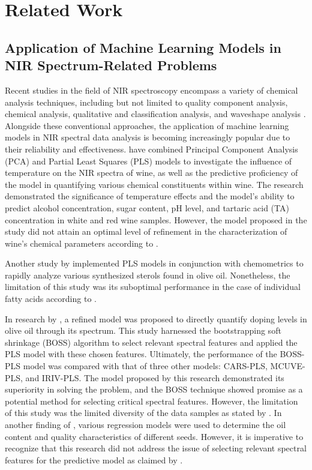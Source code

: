 \documentclass[10pt, a4paper, oneside]{article}
\begin{document}
\section{Related Work}
\subsection{Application of Machine Learning Models in NIR Spectrum-Related Problems}
Recent studies in the field of NIR spectroscopy encompass a variety of chemical analysis techniques, including but not limited to quality component analysis, chemical analysis, qualitative and classification analysis, and waveshape analysis \cite{huy2023sentiment}. Alongside these conventional approaches, the application of machine learning models in NIR spectral data analysis is becoming increasingly popular due to their reliability and effectiveness.
\cite{cozzolino2007effect} have combined Principal Component Analysis (PCA) and Partial Least Squares (PLS) models to investigate the influence of temperature on the NIR spectra of wine, as well as the predictive proficiency of the model in quantifying various chemical constituents within wine. The research demonstrated the significance of temperature effects and the model's ability to predict alcohol concentration, sugar content, pH level, and tartaric acid (TA) concentration in white and red wine samples. However, the model proposed in the study did not attain an optimal level of refinement in the characterization of wine's chemical parameters according to \cite{zhang2022review}.

Another study by \cite{ozdemir2018quantification} implemented PLS models in conjunction with chemometrics to rapidly analyze various synthesized sterols found in olive oil. Nonetheless, the limitation of this study was its suboptimal performance in the case of individual fatty acids according to \cite{zhang2022review}.

In research by \cite{jiang2019determination}, a refined model was proposed to directly quantify doping levels in olive oil through its spectrum. This study harnessed the bootstrapping soft shrinkage (BOSS) algorithm to select relevant spectral features and applied the PLS model with these chosen features. Ultimately, the performance of the BOSS-PLS model was compared with that of three other models: CARS-PLS, MCUVE-PLS, and IRIV-PLS. The model proposed by this research demonstrated its superiority in solving the problem, and the BOSS technique showed promise as a potential method for selecting critical spectral features. However, the limitation of this study was the limited diversity of the data samples as stated by \cite{zhang2022review}. In another finding of \cite{olivos2015assessing}, various regression models were used to determine the oil content and quality characteristics of different seeds. However, it is imperative to recognize that this research did not address the issue of selecting relevant spectral features for the predictive model as claimed by \cite{zhang2022review}.
\end{document}
